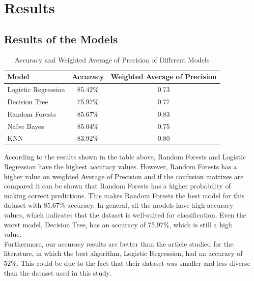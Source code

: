 

\chapter{Results}

\section{Results of the Models}

\begin{table}[htbp]
    \centering
    \begin{tabular}{|l|c|c|}
    \hline
    \textbf{Model}           & \textbf{Accuracy} & \textbf{Weighted Average of Precision} \\ \hline
    Logistic Regression & 85.42\%          & 0.73                \\ \hline
    Decision Tree       & 75.97\%          & 0.77              \\ \hline
    Random Forests      & 85.67\%          & 0.83             \\ \hline
    Naïve Bayes         & 85.04\%          & 0.75               \\ \hline
    KNN                 & 83.92\%          & 0.80               \\ \hline
    \end{tabular}
    \caption{Accuracy and Weighted Average of Precision of Different Models}
    \end{table}
    
According to the results shown in the table above, Random Forests and Logistic Regression have the highest accuracy values. However, Random Forests has a
higher value on weighted Average of Precision
and if the confusion matrixes are compared it can be shown that Random Forests has a higher 
probability of making correct predictions. This makes Random Forests the best model for this dataset with 85.67\% accuracy. 
In general, all the models have high accuracy values, which indicates that the dataset is well-suited for classification. Even the worst model, Decision Tree, has an accuracy of 75.97\%, which is still a high value.\\
Furthermore, our accuracy results are better than the article studied for the literature, in which the best algorithm, Logistic Regression, had an accuracy of 52\%. This could be due to the fact that their dataset was smaller and less diverse than the dataset used in this study.
\\

